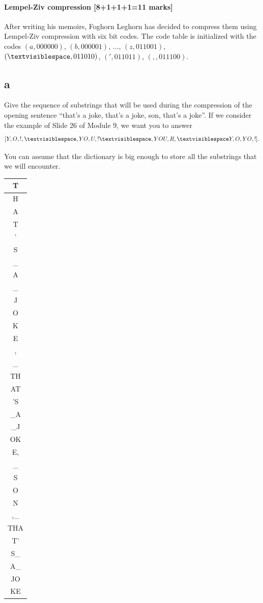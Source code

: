 \documentclass[12pt]{article}
\newcommand{\vs}{\textvisiblespace}
\begin{document}
\subsection{Lempel-Ziv compression [8+1+1+1=11 marks]}
After writing his memoirs, Foghorn Leghorn has decided to compress them
using Lempel-Ziv compression with six bit codes.
The code table is initialized with the codes
$(a,000000)$, $(b,000001)$, $\dots$, $(z,011001)$, $({\vs},011010)$,
$(',011011)$, $(, ,011100)$.
\begin{enumerate}
\part{a}Give the sequence of substrings that will be used during the compression
of the opening sentence ``that's a joke, that's a joke, son, that's a joke''.
If we consider the example of Slide 26 of Module 9, we want you to answer
$$[Y,O,!,{\vs},YO,U,!{\vs},YOU,R,{\vs}Y,O,YO,!].$$

You can assume that the dictionary is big enough to store
all the substrings that we will encounter.

\begin{sideways}
\begin{tabular}{|c|}
  \hline
  T\\
  \hline
  H\\
  \hline
  A\\
  \hline
  T\\
  \hline
  '\\
  \hline
  S\\
  \hline
  \_\\
  \hline
  A\\
  \hline
  \_\\
  \hline
  J\\
  \hline
  O\\
  \hline
  K\\
  \hline
  E\\
  \hline
  ,\\
  \hline
  \_\\
  \hline
  TH\\
  \hline
  AT\\
  \hline
  'S\\
  \hline
  \_A\\
  \hline
   \_J\\
 \hline
 OK\\
 \hline
 E,\\
 \hline
 \_\\
 \hline
 S\\
 \hline
 O\\
 \hline
 N\\
 \hline
 ,\_\\
 \hline
 THA\\
 \hline
 T'\\
 \hline
 S\_\\
 \hline
 A\_\\
 \hline
 JO\\
 \hline
 KE\\
 \hline
\end{tabular}
\end{sideways}



\end{enumerate}
\end{document}
